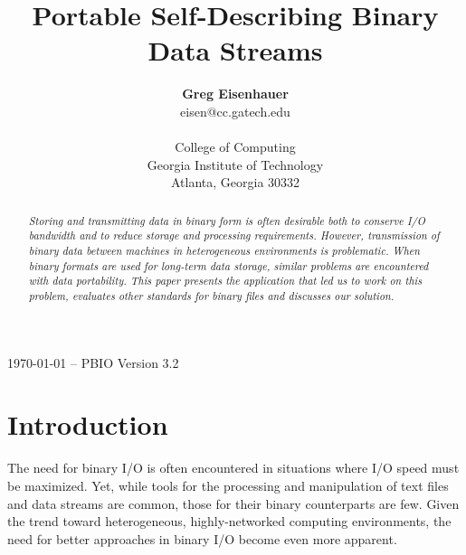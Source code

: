 \documentclass{article}
\title{Portable Self-Describing Binary Data Streams}
\author{ {\large\bf Greg Eisenhauer }\\
eisen@cc.gatech.edu \\
\ \\
College of Computing \\
Georgia Institute of Technology \\
Atlanta, Georgia 30332 \\
}
\begin{document}

\maketitle
\begin{center}
\today{} -- PBIO Version 3.2
\end{center}
\thispagestyle{empty}
\begin{abstract}
\it
Storing and transmitting data in binary form is often desirable both to
conserve I/O bandwidth and to reduce storage and processing requirements.
However, transmission of binary data between machines in heterogeneous
environments is problematic.  When binary formats are used for long-term data
storage, similar problems are encountered with data portability.  This paper
presents the application that led us to work on this problem, evaluates other
standards for binary files and discusses our solution.

\end{abstract}

\section{Introduction}

The need for binary I/O is often encountered in situations where I/O speed
must be maximized.  Yet, while tools for the processing and manipulation of
text files and data streams are common, those for their binary counterparts
are few.  Given the trend toward heterogeneous, highly-networked computing
environments, the need for better approaches in binary I/O become even more
apparent.
\end{document}

